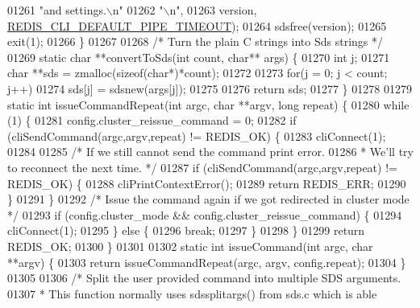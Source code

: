 \begin{DoxyCode}
{{{{{{{{{{{{{{{{{{{{{{{{{{{{{{{{{{01261 \textcolor{stringliteral}{"and settings.\(\backslash\)n"}
01262 \textcolor{stringliteral}{"\(\backslash\)n"},
01263         version, \hyperlink{redis-cli_8c_aa509dd2ea6ba533a33b1537622c215da}{REDIS\_CLI\_DEFAULT\_PIPE\_TIMEOUT});
01264     sdsfree(version);
01265     exit(1);
01266 \}
01267 
01268 \textcolor{comment}{/* Turn the plain C strings into Sds strings */}
01269 \textcolor{keyword}{static} \textcolor{keywordtype}{char} **convertToSds(\textcolor{keywordtype}{int} count, \textcolor{keywordtype}{char}** args) \{
01270   \textcolor{keywordtype}{int} j;
01271   \textcolor{keywordtype}{char} **sds = zmalloc(\textcolor{keyword}{sizeof}(\textcolor{keywordtype}{char}*)*count);
01272 
01273   \textcolor{keywordflow}{for}(j = 0; j < count; j++)
01274     sds[j] = sdsnew(args[j]);
01275 
01276   \textcolor{keywordflow}{return} sds;
01277 \}
01278 
01279 \textcolor{keyword}{static} \textcolor{keywordtype}{int} issueCommandRepeat(\textcolor{keywordtype}{int} argc, \textcolor{keywordtype}{char} **argv, \textcolor{keywordtype}{long} repeat) \{
01280     \textcolor{keywordflow}{while} (1) \{
01281         config.cluster\_reissue\_command = 0;
01282         \textcolor{keywordflow}{if} (cliSendCommand(argc,argv,repeat) != REDIS\_OK) \{
01283             cliConnect(1);
01284 
01285             \textcolor{comment}{/* If we still cannot send the command print error.}
01286 \textcolor{comment}{             * We'll try to reconnect the next time. */}
01287             \textcolor{keywordflow}{if} (cliSendCommand(argc,argv,repeat) != REDIS\_OK) \{
01288                 cliPrintContextError();
01289                 \textcolor{keywordflow}{return} REDIS\_ERR;
01290             \}
01291          \}
01292          \textcolor{comment}{/* Issue the command again if we got redirected in cluster mode */}
01293          \textcolor{keywordflow}{if} (config.cluster\_mode && config.cluster\_reissue\_command) \{
01294             cliConnect(1);
01295          \} \textcolor{keywordflow}{else} \{
01296              \textcolor{keywordflow}{break};
01297         \}
01298     \}
01299     \textcolor{keywordflow}{return} REDIS\_OK;
01300 \}
01301 
01302 \textcolor{keyword}{static} \textcolor{keywordtype}{int} issueCommand(\textcolor{keywordtype}{int} argc, \textcolor{keywordtype}{char} **argv) \{
01303     \textcolor{keywordflow}{return} issueCommandRepeat(argc, argv, config.repeat);
01304 \}
01305 
01306 \textcolor{comment}{/* Split the user provided command into multiple SDS arguments.}
01307 \textcolor{comment}{ * This function normally uses sdssplitargs() from sds.c which is able}
}}}}}}}}}}}}}}}}}}}}}}}}}}}}}}}}}}
\end{DoxyCode}
